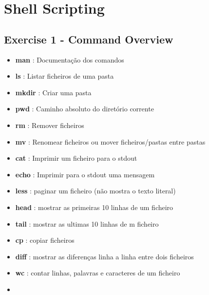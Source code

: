 \documentclass[]{article}
\author{}
\date{}
\begin{document}
\section{Shell Scripting}\label{shell-scripting}

\subsection{Exercise 1 - Command
Overview}\label{exercise-1---command-overview}

\begin{itemize}
\itemsep1pt\parskip0pt
\item
  \textbf{man } : Documentação dos comandos\\
\item
  \textbf{ls} : Listar ficheiros de uma pasta\\
\item
  \textbf{mkdir} : Criar uma pasta\\
\item
  \textbf{pwd} : Caminho absoluto do diretório corrente\\
\item
  \textbf{rm} : Remover ficheiros
\item
  \textbf{mv} : Renomear ficheiros ou mover ficheiros/pastas entre
  pastas\\
\item
  \textbf{cat} : Imprimir um ficheiro para o stdout\\
\item
  \textbf{echo} : Imprimir para o stdout uma mensagem\\
\item
  \textbf{less} : paginar um ficheiro (não mostra o texto literal)\\
\item
  \textbf{head} : mostrar as primeiras 10 linhas de um ficheiro\\
\item
  \textbf{tail} : mostrar as ultimas 10 linhas de m ficheiro\\
\item
  \textbf{cp} : copiar ficheiros\\
\item
  \textbf{diff} : mostrar as diferenças linha a linha entre dois
  ficheiros\\
\item
  \textbf{wc} : contar linhas, palavras e caracteres de um ficheiro\\
\item

\end{itemize}
\end{document}
